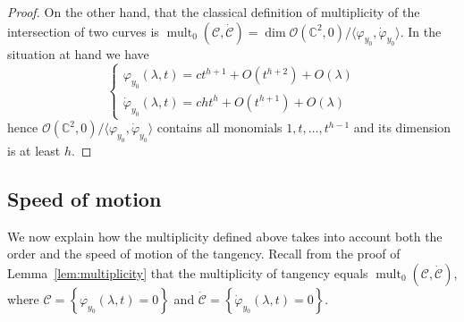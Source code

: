 \documentclass[11pt, oneside]{amsart}
\newcommand{\C}{\mathbb{C}}
\newcommand{\set}[1]{\left\{#1\right\}}
\newcommand{\cd}{{\C^2}}
\newcommand{\lrpar}[1]{\left(#1\right)}
\DeclareMathOperator{\mult}{mult}
\theoremstyle{remark}
\theoremstyle{definition}
\theoremstyle{theorem}
\newcommand{\romain}[1]{{\color{red}*}\marginpar{\tiny  \color{red} RD: #1}}
\begin{document}
\begin{proof}
 
On the other hand, that the classical definition of multiplicity of the intersection of two curves 
 is  $\mult_0(\mathcal C, \dot{\mathcal C}) = 
 \dim\mathcal{O}(\cd, 0)/\langle \varphi_{y_0}, \dot \varphi_{y_0}\rangle$.
  In the situation at hand we have 
\begin{equation}\label{eq:gamma_gammaprime}
\begin{cases}
 \varphi_{y_0}(\lambda, t)   = c t^{h+1} + O({t^{h+2}})+ O\lrpar{\lambda} \\
 \dot\varphi_{y_0}(\lambda, t)   = ch t^{h} + O({t^{h+1}})+ O\lrpar{\lambda} \end{cases}
 \end{equation} hence 
$\mathcal{O}(\cd, 0)/\langle \varphi_{y_0}, \dot  \varphi_{y_0}\rangle$ contains all monomials 
$1, t , \ldots , t^{h-1}$ and its dimension is at least $h$.  
\end{proof}
  
\subsection{Speed of motion} \label{subs:speed}  
We now explain how  the multiplicity defined above  takes into account both the order 
and the speed of motion of the tangency. %
Recall from the   proof of Lemma~\ref{lem:multiplicity} 
that the multiplicity of tangency equals 
$\mult_0(\mathcal C, \dot{\mathcal C})$, where  
 $\mathcal C= \set{\varphi_{y_0}(\lambda, t)  = 0}$ and $\dot{\mathcal {C}}= 
 \set{\dot{\varphi}_{y_0}(\lambda, t) = 0}$.
 
\end{document}
